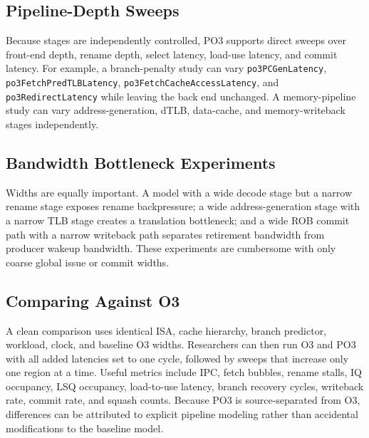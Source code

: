 \documentclass[10pt,twocolumn]{article}
\newcommand{\po}{\textsc{PO3}}
\newcommand{\oo}{\textsc{O3}}
\begin{document}
\subsection{Pipeline-Depth Sweeps}
Because stages are independently controlled, \po{} supports direct sweeps over front-end depth, rename depth, select latency, load-use latency, and commit latency.  For example, a branch-penalty study can vary \texttt{po3PCGenLatency}, \texttt{po3FetchPredTLBLatency}, \texttt{po3FetchCacheAccessLatency}, and \texttt{po3RedirectLatency} while leaving the back end unchanged.  A memory-pipeline study can vary address-generation, dTLB, data-cache, and memory-writeback stages independently.

\subsection{Bandwidth Bottleneck Experiments}
Widths are equally important.  A model with a wide decode stage but a narrow rename stage exposes rename backpressure; a wide address-generation stage with a narrow TLB stage creates a translation bottleneck; and a wide ROB commit path with a narrow writeback path separates retirement bandwidth from producer wakeup bandwidth.  These experiments are cumbersome with only coarse global issue or commit widths.

\subsection{Comparing Against O3}
A clean comparison uses identical ISA, cache hierarchy, branch predictor, workload, clock, and baseline \oo{} widths.  Researchers can then run \oo{} and \po{} with all added latencies set to one cycle, followed by sweeps that increase only one region at a time.  Useful metrics include IPC, fetch bubbles, rename stalls, IQ occupancy, LSQ occupancy, load-to-use latency, branch recovery cycles, writeback rate, commit rate, and squash counts.  Because \po{} is source-separated from \oo{}, differences can be attributed to explicit pipeline modeling rather than accidental modifications to the baseline model.
\end{document}
